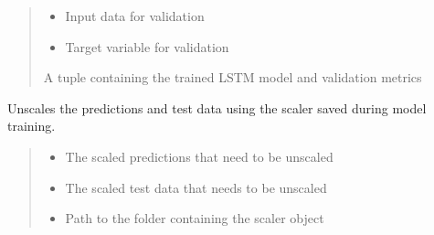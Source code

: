 \documentclass[letterpaper,10pt,english]{sphinxmanual}
\begin{document}
\begin{fulllineitems}
\begin{fulllineitems}
\begin{quote}
\begin{description}
\begin{itemize}
\item {} 
\sphinxAtStartPar
{} \textendash{} Input data for validation

\item {} 
\sphinxAtStartPar
{} \textendash{} Target variable for validation

\end{itemize}

\sphinxAtStartPar
A tuple containing the trained LSTM model and validation metrics

\end{description}\end{quote}

\end{fulllineitems}


\begin{fulllineitems}
\label{\detokenize{docs/LSTM_model:LSTM_model.LSTM_Predictor.unscale_data}}
\pysigstartsignatures
{}
\pysigstopsignatures
\sphinxAtStartPar
Unscales the predictions and test data using the scaler saved during model training.
\begin{quote}\begin{description}
\begin{itemize}
\item {} 
\sphinxAtStartPar
{} \textendash{} The scaled predictions that need to be unscaled

\item {} 
\sphinxAtStartPar
{} \textendash{} The scaled test data that needs to be unscaled

\item {} 
\sphinxAtStartPar
{} \textendash{} Path to the folder containing the scaler object

\end{itemize}

\end{description}\end{quote}

\end{fulllineitems}


\end{fulllineitems}
\end{document}
